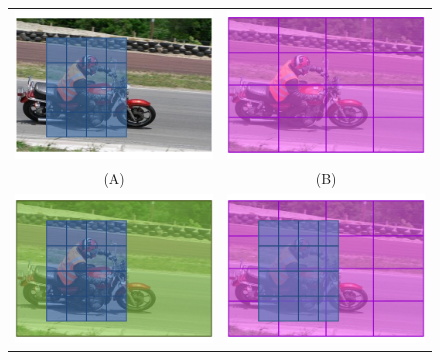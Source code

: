 \documentclass[extendedabs]{bmvc2k}
\begin{document}
\begin{figure}[ht]
\begin{center}
  \hspace{-.7cm}
  \begin{minipage}{0.53\linewidth}  
    \begin{tabular}{cc}
      \includegraphics[width=0.42\linewidth]{figs/caseA.pdf} & \hspace{-.3cm}
      \includegraphics[width=0.42\linewidth]{figs/caseB.pdf}\vspace{-.2cm}\\
      (A)&(B)\vspace{-.1cm}\\
      \includegraphics[width=0.42\linewidth]{figs/caseC1.pdf} & \hspace{-.3cm}
      \includegraphics[width=0.42\linewidth]{figs/caseC2.pdf}\vspace{-.2cm}\\

\end{tabular}
\end{minipage}
\end{center}
\end{figure}
\end{document}

